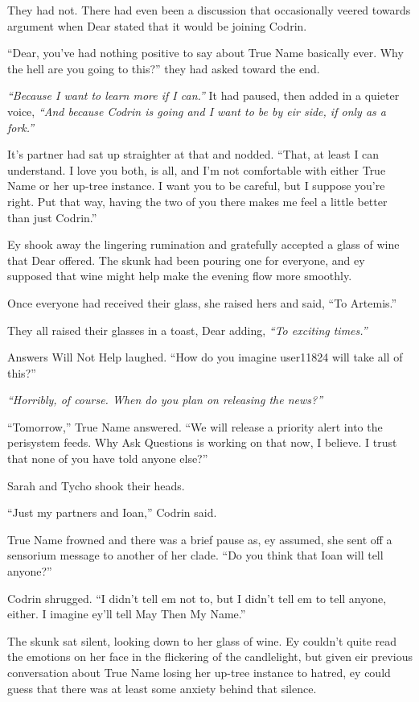 They had not. There had even been a discussion that occasionally veered towards argument when Dear stated that it would be joining Codrin.

``Dear, you've had nothing positive to say about True Name basically ever. Why the hell are you going to this?'' they had asked toward the end.

\emph{``Because I want to learn more if I can.''} It had paused, then added in a quieter voice, \emph{``And because Codrin is going and I want to be by eir side, if only as a fork.''}

It's partner had sat up straighter at that and nodded. ``That, at least I can understand. I love you both, is all, and I'm not comfortable with either True Name or her up-tree instance. I want you to be careful, but I suppose you're right. Put that way, having the two of you there makes me feel a little better than just Codrin.''

Ey shook away the lingering rumination and gratefully accepted a glass of wine that Dear offered. The skunk had been pouring one for everyone, and ey supposed that wine might help make the evening flow more smoothly.

Once everyone had received their glass, she raised hers and said, ``To Artemis.''

They all raised their glasses in a toast, Dear adding, \emph{``To exciting times.''}

Answers Will Not Help laughed. ``How do you imagine user11824 will take all of this?''

\emph{``Horribly, of course. When do you plan on releasing the news?''}

``Tomorrow,'' True Name answered. ``We will release a priority alert into the perisystem feeds. Why Ask Questions is working on that now, I believe. I trust that none of you have told anyone else?''

Sarah and Tycho shook their heads.

``Just my partners and Ioan,'' Codrin said.

True Name frowned and there was a brief pause as, ey assumed, she sent off a sensorium message to another of her clade. ``Do you think that Ioan will tell anyone?''

Codrin shrugged. ``I didn't tell em not to, but I didn't tell em to tell anyone, either. I imagine ey'll tell May Then My Name.''

The skunk sat silent, looking down to her glass of wine. Ey couldn't quite read the emotions on her face in the flickering of the candlelight, but given eir previous conversation about True Name losing her up-tree instance to hatred, ey could guess that there was at least some anxiety behind that silence.

